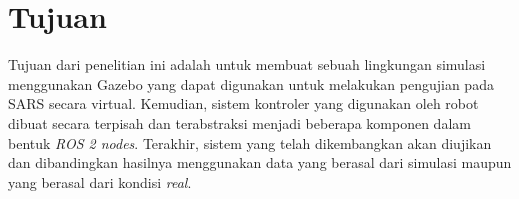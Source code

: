 \section{Tujuan}
\label{sec:Tujuan}

Tujuan dari penelitian ini adalah untuk membuat sebuah lingkungan simulasi menggunakan Gazebo yang dapat digunakan untuk melakukan pengujian pada SARS secara virtual.
Kemudian,
  sistem kontroler yang digunakan oleh robot dibuat secara terpisah dan terabstraksi menjadi beberapa komponen dalam bentuk \emph{ROS 2 nodes}.
Terakhir, sistem yang telah dikembangkan akan diujikan dan dibandingkan hasilnya menggunakan data yang berasal dari simulasi maupun yang berasal dari kondisi \emph{real}.
